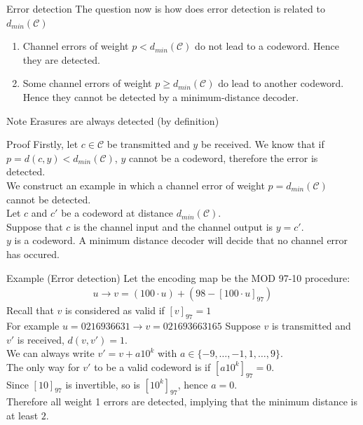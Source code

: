 \begin{parag}{Error detection}
    The question now is how does error detection is related to $d_{min}\left(\mathcal{C}\right)$
    \begin{theoreme}
        \begin{enumerate}
            \item Channel errors of weight $p < d_{min}\left(\mathcal{C}\right)$ do not lead to a codeword. Hence they are detected.
            \item Some channel errors of weight $p \geq d_{min}\left(\mathcal{C}\right)$ do lead to another codeword. Hence they cannot be detected by a minimum-distance decoder.
        \end{enumerate}
        
    \end{theoreme}
    \begin{subparag}{Note}
        Erasures are always detected (by definition)
    \end{subparag}
    \begin{subparag}{Proof}
       Firstly, let $c \in \mathcal{C}$ be transmitted and $y$ be received. We know that if $p = d\left(c, y\right) < d_{min}\left(\mathcal{C}\right)$, $y$ cannot be a codeword, therefore the error is detected.\\ 
    We construct an example in which a channel error of weight $p = d_{min}\left(\mathcal{C}\right)$ cannot be detected.\\
    Let $c$ and $c'$ be a codeword at distance $d_{min}\left(\mathcal{C}\right)$.\\
    Suppose that $c$ is the channel input and the channel output is $y = c'$. \\
    $y$ is a codeword. A minimum distance decoder will decide that no channel error has occured.
    \end{subparag}
\end{parag}

\begin{parag}{Example (Error detection)}
    Let the encoding map be the MOD 97-10 procedure:
    \begin{align*} u \to v = \left(100 \cdot  u\right) + \left(98 - \left[100 \cdot  u\right]_{97}\right) \end{align*}
    Recall that $v$ is considered as valid if $\left[v\right]_{97} = 1$\\
    For example $u = 0216936631 \to v = 021693663165$
    Suppose $v$ is transmitted and $v'$ is received, $d\left(v, v'\right) = 1$.\\
    We can always write $v' = v + a10^k$ with $a \in \{-9, \ldots, -1, 1, \ldots, 9\}$.\\
    The only way for $v'$ to be a valid codeword is if $\left[a10^k\right]_{97} = 0$.\\
    Since $\left[10\right]_{97}$ is invertible, so is $\left[10^k\right]_{97}$, hence $a = 0$.\\
    Therefore all weight 1 errors are detected, implying that the minimum distance is at least $2$.
\end{parag}

